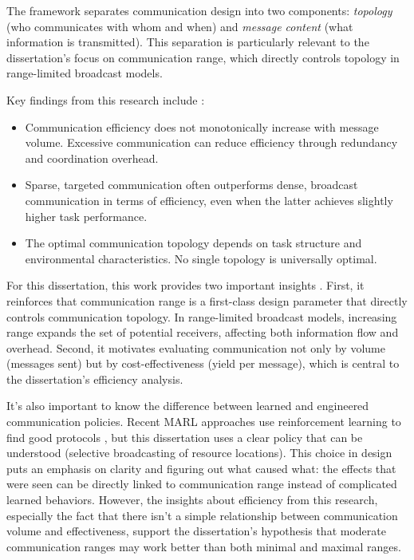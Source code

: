 The framework separates communication design into two components: \emph{topology} (who communicates with whom and when) and \emph{message content} (what information is transmitted). This separation is particularly relevant to the dissertation's focus on communication range, which directly controls topology in range-limited broadcast models.

Key findings from this research include \citep{zhang2024}:

\begin{itemize}
    \item Communication efficiency does not monotonically increase with message volume. Excessive communication can reduce efficiency through redundancy and coordination overhead.

    \item Sparse, targeted communication often outperforms dense, broadcast communication in terms of efficiency, even when the latter achieves slightly higher task performance.

    \item The optimal communication topology depends on task structure and environmental characteristics. No single topology is universally optimal.
\end{itemize}

For this dissertation, this work provides two important insights \citep{zhang2024}. First, it reinforces that communication range is a first-class design parameter that directly controls communication topology. In range-limited broadcast models, increasing range expands the set of potential receivers, affecting both information flow and overhead. Second, it motivates evaluating communication not only by volume (messages sent) but by cost-effectiveness (yield per message), which is central to the dissertation's efficiency analysis.

It's also important to know the difference between learned and engineered communication policies. Recent MARL approaches use reinforcement learning to find good protocols \citep{zhang2024}, but this dissertation uses a clear policy that can be understood (selective broadcasting of resource locations). This choice in design puts an emphasis on clarity and figuring out what caused what: the effects that were seen can be directly linked to communication range instead of complicated learned behaviors. However, the insights about efficiency from this research, especially the fact that there isn't a simple relationship between communication volume and effectiveness, support the dissertation's hypothesis that moderate communication ranges may work better than both minimal and maximal ranges.

